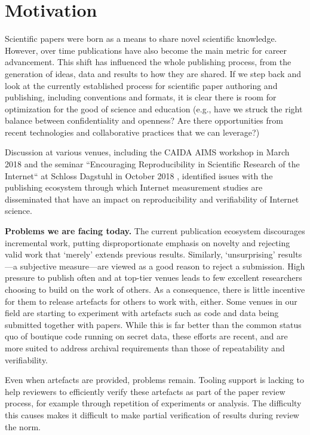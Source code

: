 \documentclass[sigconf,10pt]{acmart}
\begin{document}
\section{Motivation}
\label{sec:intro}

Scientific papers were born as a means to share novel scientific knowledge.
However, over time publications have also become the main metric for career
advancement. This shift has influenced the whole publishing process, from the
generation of ideas, data and results to how they are shared. If we step back
and look at the currently established process for scientific paper authoring and
publishing, including conventions and formats, it is clear there is room for
optimization for the good of science and education (e.g.,  have we struck the
right balance between confidentiality and openness? Are there opportunities from
recent technologies and collaborative practices that we can leverage?)

Discussion at various venues, including the CAIDA AIMS workshop in March 2018
\cite{aims-presentation} and the seminar ``Encouraging Reproducibility in
Scientific Research of the Internet`` at Schloss Dagstuhl in October 2018
\cite{dagstuhl-site}, identified issues with the publishing ecosystem through
which Internet measurement studies are disseminated that have an impact on
reproducibility and verifiability of Internet science.

\textbf{Problems we are facing today.} The current publication ecosystem
discourages incremental work, putting disproportionate emphasis on novelty and
rejecting valid work that `merely' extends previous results. Similarly,
`unsurprising' results---a subjective measure---are viewed as a good reason to
reject a submission. High pressure to publish often and at top-tier venues
leads to few excellent researchers choosing to build on the work of others. As
a consequence, there is little incentive for them to release artefacts for
others to work with, either. Some venues in our field are starting to
experiment with artefacts such as code and data being submitted together with
papers. While this is far better than the common status quo of boutique code
running on secret data, these efforts are recent, and are more suited to
address archival requirements than those of repeatability and verifiability. 

Even when artefacts are provided, problems remain. Tooling support is lacking
to help reviewers to efficiently verify these artefacts as part of the paper
review process, for example through repetition of experiments or analysis. The
difficulty this causes makes it difficult to make partial verification of
results during review the norm.
\end{document}
